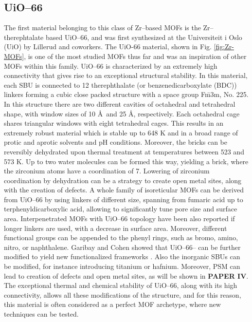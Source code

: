 \subsection*{UiO--66}
The first material belonging to this class of Zr--based MOFs is the Zr--therephtalate based UiO--66, and was first synthesized at the Universiteit i Oslo (UiO) by Lillerud and coworkers\cite{cavka2008new}. The UiO-66 material, shown in Fig. \ref{fig:Zr-MOFs}, is one of the most studied MOFs thus far and was an inspiration of other MOFs within this family. UiO--66 is characterized by an extremely high connectivity that gives rise to an exceptional structural stability. In this material, each  SBU is connected to 12 therephthalate (or benzenedicarboxylate (BDC)) linkers forming a cubic close packed structure with a space group F\={m}3m, No. 225. In this structure there are two different cavities of octahedral and tetrahedral shape, with window sizes of 10 \AA\ and 25 \AA, respectively. Each octahedral cage shares triangular windows with eight tetrahedral cages. 
This results in an extremely robust material which is stable up to 648 K and in a broad range of protic and aprotic solvents and pH conditions. Moreover, the  bricks can be reversibly dehydrated upon thermal treatment at temperatures between 523 and 573 K. Up to two water molecules can be formed this way, yielding a  brick, where the zirconium atoms have a coordination of 7\cite{valenzano2011disclosing}. Lowering of zirconium coordination by dehydration can be a strategy to create open metal sites, along with the creation of defects.
\npar
A whole family of isoreticular MOFs can be derived from UiO--66 by using linkers of different size, spanning from fumaric acid\cite{wissmann2012modulated} up to terphenyldicarboxylic acid\cite{schaate2011modulated}, allowing to significantly tune pore size and surface area. Interpenetrated MOFs with UiO--66 topology have been also reported if longer linkers are used\cite{schaate2011porous}, with a decrease in surface area. Moreover, different functional groups can be appended to the phenyl rings, such as bromo, amino, nitro, or naphthalene. Garibay and Cohen showed that UiO--66-- can be further modified to yield new functionalized frameworks \cite{garibay2010isoreticular}. Also the inorganic SBUs can be modified, for instance introducing titanium or hafnium\cite{kim2012postsynthetic}. Moreover, PSM can lead to creation of defects and open metal sites, as will be shown in \textbf{PAPER IV}. The exceptional thermal and chemical stability of UiO--66, along with its high connectivity, allows all these modifications of the structure, and for this reason, this material is often considered as a perfect MOF archetype, where new techniques can be tested. 

